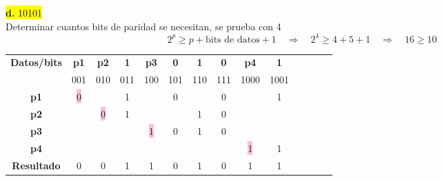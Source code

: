 \documentclass{article}
\begin{document}
	\begin{center}
		\hspace{3cm}\colorbox{yellow}{{\textbf{d.} 10101}}\newline
		\\Determinar cuantos bits de paridad se necesitan, se prueba con 4
		\[
		2^p \geq p + \text{bits de datos} + 1
		\quad \Rightarrow \quad	2^4 \geq 4 + 5 + 1 \quad \Rightarrow \quad 16 \geq 10
		\]
		
		\begin{table}[h!]
			\centering
			\begin{tabular}{c|ccccccccccccc}
				\toprule
				\textbf{Datos/bits} & \textbf{p1} & \textbf{p2} & \textbf{1} & \textbf{p3} & \textbf{0} & \textbf{1} & \textbf{0} & \textbf{p4} & \textbf{1}\\ & \scriptsize001 & \scriptsize010 & \scriptsize011 & \scriptsize100 & \scriptsize101 & \scriptsize110 & \scriptsize111 & \scriptsize1000 & \scriptsize1001\\
				\midrule
				\textbf{p1} & \colorbox{pink}{0} & & 1 & & 0 & & 0 & & 1\\
				\midrule
				\textbf{p2} &  & \colorbox{pink}{0} & 1 & & & 1 & 0 & & \\
				\midrule
				\textbf{p3} & & & & \colorbox{pink}{1} & 0 & 1 & 0 & & \\
				\midrule
				\textbf{p4} & & & & & & & & \colorbox{pink}{1} & 1\\
				\midrule
				\midrule
				\textbf{Resultado} & 0 & 0 & 1 & 1 & 0 & 1 & 0 & 1 & 1\\
				\bottomrule
			\end{tabular}
		\end{table}
	\end{center}
\end{document}
